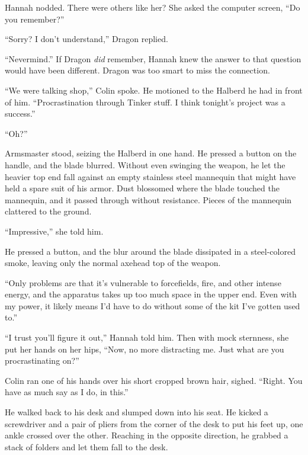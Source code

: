 Hannah nodded.  There were others like her?  She asked the computer screen, ``Do you remember?''



``Sorry?  I don't understand,'' Dragon replied.



``Nevermind.''  If Dragon \emph{did} remember, Hannah knew the answer to that question would have been different.  Dragon was too smart to miss the connection.



``We were talking shop,'' Colin spoke.  He motioned to the Halberd he had in front of him.  ``Procrastination through Tinker stuff.  I think tonight's project was a success.''



``Oh?''



Armsmaster stood, seizing the Halberd in one hand.  He pressed a button on the handle, and the blade blurred.  Without even swinging the weapon, he let the heavier top end fall against an empty stainless steel mannequin that might have held a spare suit of his armor.  Dust blossomed where the blade touched the mannequin, and it passed through without resistance.  Pieces of the mannequin clattered to the ground.



``Impressive,'' she told him.



He pressed a button, and the blur around the blade dissipated in a steel-colored smoke, leaving only the normal axehead top of the weapon.



``Only problems are that it's vulnerable to forcefields, fire, and other intense energy, and the apparatus takes up too much space in the upper end.  Even with my power, it likely means I'd have to do without some of the kit I've gotten used to.''



``I trust you'll figure it out,'' Hannah told him.  Then with mock sternness, she put her hands on her hips, ``Now, no more distracting me.  Just what are you procrastinating on?''



Colin ran one of his hands over his short cropped brown hair, sighed.  ``Right.  You have as much say as I do, in this.''



He walked back to his desk and slumped down into his seat.  He kicked a screwdriver and a pair of pliers from the corner of the desk to put his feet up, one ankle crossed over the other.  Reaching in the opposite direction, he grabbed a stack of folders and let them fall to the desk.



